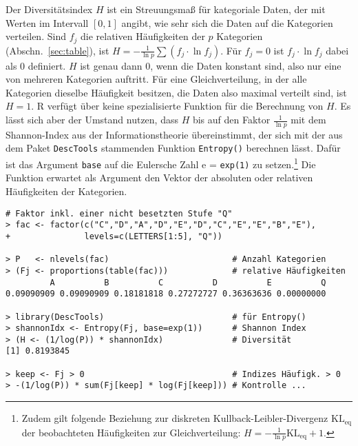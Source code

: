 Der Diversitätsindex $H$ ist ein Streuungsmaß für kategoriale Daten, der mit Werten im Intervall $[0, 1]$ angibt, wie sehr sich die Daten auf die Kategorien verteilen. Sind $f_{j}$ die relativen Häufigkeiten der $p$ Kategorien (Abschn.\ \ref{sec:table}), ist $H = -\frac{1}{\ln p} \sum{(f_{j} \cdot \ln{f_{j}})}$. Für $f_{j} = 0$ ist $f_{j} \cdot \ln{f_{j}}$ dabei als $0$ definiert. $H$ ist genau dann $0$, wenn die Daten konstant sind, also nur eine von mehreren Kategorien auftritt. Für eine Gleichverteilung, in der alle Kategorien dieselbe Häufigkeit besitzen, die Daten also maximal verteilt sind, ist $H = 1$. R verfügt über keine spezialisierte Funktion für die Berechnung von $H$. Es lässt sich aber der Umstand nutzen, dass $H$ bis auf den Faktor $\frac{1}{\ln p}$ mit dem Shannon-Index aus der Informationstheorie übereinstimmt, der sich mit der aus dem Paket \lstinline!DescTools! stammenden Funktion \lstinline!Entropy()! berechnen lässt. Dafür ist das Argument \lstinline!base! auf die Eulersche Zahl e = \lstinline!exp(1)! zu setzen.\footnote{Zudem gilt folgende Beziehung zur diskreten Kullback-Leibler-Divergenz $\text{KL}_{\text{eq}}$ der beobachteten Häufigkeiten zur Gleichverteilung: $H = -\frac{1}{\ln p} \text{KL}_{\text{eq}} + 1$.} Die Funktion erwartet als Argument den Vektor der absoluten oder relativen Häufigkeiten der Kategorien.
\begin{lstlisting}
# Faktor inkl. einer nicht besetzten Stufe "Q"
> fac <- factor(c("C","D","A","D","E","D","C","E","E","B","E"),
+               levels=c(LETTERS[1:5], "Q"))

> P   <- nlevels(fac)                         # Anzahl Kategorien
> (Fj <- proportions(table(fac)))             # relative Häufigkeiten
         A          B          C          D          E          Q
0.09090909 0.09090909 0.18181818 0.27272727 0.36363636 0.00000000

> library(DescTools)                          # für Entropy()
> shannonIdx <- Entropy(Fj, base=exp(1))      # Shannon Index
> (H <- (1/log(P)) * shannonIdx)              # Diversität
[1] 0.8193845

> keep <- Fj > 0                              # Indizes Häufigk. > 0
> -(1/log(P)) * sum(Fj[keep] * log(Fj[keep])) # Kontrolle ...
\end{lstlisting}

